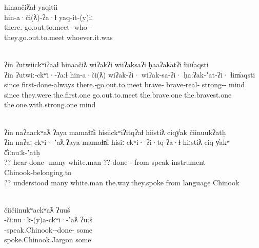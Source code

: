 \begin{exe}
  \glllll hinaačiƛ̓aɬ                            yaqitii\\
  hin‑a·či(ƛ)‑ʔa·ɬ                      yaq‑it‑(y)iː\\
  there.‑go.out.to.meet‑ who‑‑\\
  they.go.out.to.meet                   whoever.it.was\\
                               \\
  \vfix

  \glllll ʔin   ʔutwiickʷiʔaaɬ          hinaačiƛ                      wiʔakʔi        wiiʔaksaʔi           ḥaaʔak̓atʔi                ɬim̓aqsti\\
  ʔin   ʔutwiː‑ckʷi·‑ʔaːɬ       hin‑a·či(ƛ)                   wiʔak‑ʔi·      wiʔak‑sa‑ʔi·         ḥaːʔak‑ʼat‑ʔi·            ɬim̓aqsti\\
  since first‑done‑always       there.‑go.out.to.meet brave‑ brave‑real‑  strong‑‑ mind\\
  since they.were.the.first.one go.out.to.meet                the.brave.one  the.bravest.one      the.one.with.strong.one   mind\\
  { }                                                                             \\
  \vfix

  \glllll ʔin naʔaackʷaƛ         ʔaya     mamaɬn̓i   hisiickʷiʔitqʔaɬ           hiistiƛ   ciqy̓ak           čiinuukʔatḥ\\
  ʔin naʔaː‑ckʷi·‑ʼaƛ    ʔaya     mamaɬn̓i   hisiː‑ckʷi·‑ʔi·tq‑ʔa·ɬ     hiːstiƛ   ciq‑y̓akʷ         č̓iːnuːk‑ʼatḥ\\
  ??  hear‑done‑ many     white.man ??‑done‑‑ from      speak‑instrument Chinook‑belonging.to\\
  ??  understood         many     white.man the.way.they.spoke         from      language         Chinook\\
  { }                                           \\
  \vfix

  \glllll čiičiinukʷackʷaƛ                                ʔuuš\\
  ‑čiːnu·k‑(y)a‑ckʷi·‑ʼaƛ                 ʔuːš\\
  ‑speak.Chinook‑‑done‑ some\\
  spoke.Chinook.Jargon                            some\\
                                         \\
  \vfix


\end{exe}
